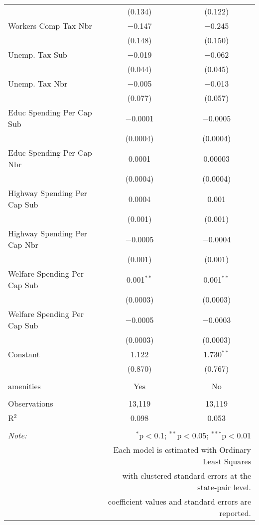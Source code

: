 \begin{table}[!htbp]
\begin{tabular}{@{\extracolsep{5pt}}lcc}
  & (0.134) & (0.122) \\ 
  Workers Comp Tax Nbr & $-$0.147 & $-$0.245 \\ 
  & (0.148) & (0.150) \\ 
  Unemp. Tax Sub & $-$0.019 & $-$0.062 \\ 
  & (0.044) & (0.045) \\ 
  Unemp. Tax Nbr & $-$0.005 & $-$0.013 \\ 
  & (0.077) & (0.057) \\ 
  Educ Spending Per Cap Sub & $-$0.0001 & $-$0.0005 \\ 
  & (0.0004) & (0.0004) \\ 
  Educ Spending Per Cap Nbr & 0.0001 & 0.00003 \\ 
  & (0.0004) & (0.0004) \\ 
  Highway Spending Per Cap Sub & 0.0004 & 0.001 \\ 
  & (0.001) & (0.001) \\ 
  Highway Spending Per Cap Nbr & $-$0.0005 & $-$0.0004 \\ 
  & (0.001) & (0.001) \\ 
  Welfare Spending Per Cap Sub & 0.001$^{**}$ & 0.001$^{**}$ \\ 
  & (0.0003) & (0.0003) \\ 
  Welfare Spending Per Cap Sub & $-$0.0005 & $-$0.0003 \\ 
  & (0.0003) & (0.0003) \\ 
  Constant & 1.122 & 1.730$^{**}$ \\ 
  & (0.870) & (0.767) \\ 
 \hline \\[-1.8ex] 
amenities & Yes & No \\ 
\hline \\[-1.8ex] 
Observations & 13,119 & 13,119 \\ 
R$^{2}$ & 0.098 & 0.053 \\ 
\hline 
\hline \\[-1.8ex] 
\textit{Note:}  & \multicolumn{2}{r}{$^{*}$p$<$0.1; $^{**}$p$<$0.05; $^{***}$p$<$0.01} \\ 
 & \multicolumn{2}{r}{Each model is estimated with Ordinary Least Squares} \\ 
 & \multicolumn{2}{r}{with clustered standard errors at the state-pair level.} \\ 
 & \multicolumn{2}{r}{coefficient values and standard errors are reported.} \\ 
\end{tabular} 
\end{table} 
